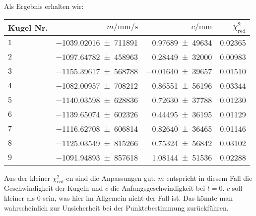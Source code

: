 		Als Ergebnis erhalten wir:
		\begin{center}
			\begin{tabular}{lrrr}
				\toprule
				Kugel Nr. & $m/\si{\milli\meter\per\second}$ & $c/\si{\milli\meter}$ & $\chi^2_\text{red}$ \\
				\midrule
					$1$ & \num{-1039,02016(711891)} & \num{0,97689(49634)} & \num{0,02365} \\
					$2$ & \num{-1097,64782(458963)} & \num{0,28449(32000)} & \num{0,00983} \\
					$3$ & \num{-1155,39617(568788)} & \num{-0,01640(39657)} & \num{0,01510} \\
					$4$ & \num{-1082,00957(708212)} & \num{0,86551(56196)} & \num{0,03344} \\
					$5$ & \num{-1140,03598(628836)} & \num{0,72630(37788)} & \num{0,01230} \\
					$6$ & \num{-1139,65074(602326)} & \num{0,44495(36195)} & \num{0,01129} \\
					$7$ & \num{-1116,62708(606814)} & \num{0,82640(36465)} & \num{0,01146} \\
					$8$ & \num{-1125,03549(815266)} & \num{0,75324(56842)} & \num{0,03102} \\
					$9$ & \num{-1091,94893(857618)} & \num{1,08144(51536)} & \num{0,02288} \\
				\bottomrule
			\end{tabular}
		\end{center}
		Aus der kleiner $\chi^2_\text{red}$-en sind die Anpassungen gut. $m$ entspricht in diesem Fall die Geschwindigkeit der Kugeln und $c$ die Anfangsgeschwindigkeit bei $t=0$. $c$ soll kleiner als $0$ sein, was hier im Allgemein nicht der Fall ist. Das könnte man wahrscheinlich zur Unsicherheit bei der Punktebestimmung zurückführen.

